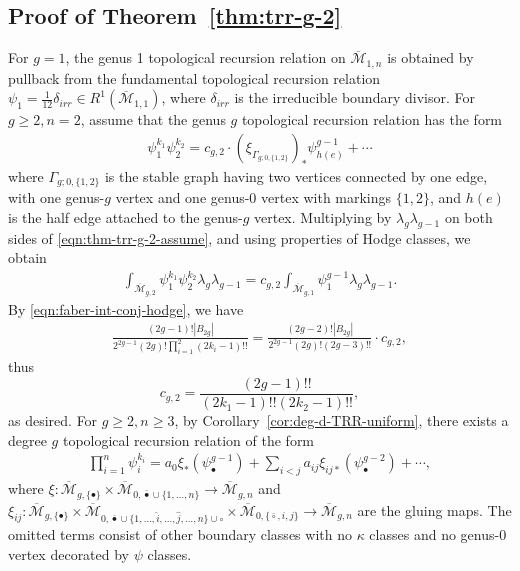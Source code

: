 \documentclass[12pt,reqno]{amsart}
\theoremstyle{plain}
\theoremstyle{definition}
\theoremstyle{remark}
\begin{document}
\subsection{Proof of Theorem~\ref{thm:trr-g-2}}
For $g=1$, the genus 1 topological recursion relation on $\overline{\mathcal{M}}_{1,n}$ is obtained by pullback from the fundamental topological recursion relation $\psi_1=\frac{1}{12}\delta_{irr}\in R^1(\overline{\mathcal{M}}_{1,1})$, where $\delta_{irr}$ is the irreducible boundary divisor.
For $g\geq2, n=2$, assume that the genus $g$ topological recursion relation has the form
\begin{align}\label{eqn:thm-trr-g-2-assume}
\psi_1^{k_1}\psi_2^{k_2}=c_{g,2}\cdot\left(\xi_{\Gamma_{g;0,\{1,2\}}}\right)_*\psi_{h(e)}^{g-1}+\cdots
\end{align}
where $\Gamma_{g;0,\{1,2\}}$ is the stable graph having two vertices connected by one edge, with one genus-$g$ vertex and one genus-0 vertex with markings $\{1,2\}$, and $h(e)$ is the half edge attached to the genus-$g$ vertex.  
Multiplying by $\lambda_{g}\lambda_{g-1}$ on both sides of \eqref{eqn:thm-trr-g-2-assume}, and using properties of Hodge classes, we obtain
\begin{align*}
\int_{\overline{\mathcal{M}}_{g,2}}\psi_1^{k_1}\psi_{2}^{k_2}\lambda_g\lambda_{g-1}=c_{g,2}\int_{\overline{\mathcal{M}}_{g,1}}\psi_1^{g-1}\lambda_g\lambda_{g-1}.   
\end{align*}
By \eqref{eqn:faber-int-conj-hodge}, we have
\begin{align*}
\frac{(2g-1)!
|B_{2g}|}{2^{2g-1}(2g)!\prod_{i=1}^{2}(2k_i-1)!!}=\frac{(2g-2)!
|B_{2g}|}{2^{2g-1}(2g)!(2g-3)!!}  \cdot c_{g,2},  
\end{align*}
thus
\[c_{g,2}=\frac{(2g-1)!!}{(2k_1-1)!!(2k_2-1)!!},\]
as desired.
For $g\geq2, n\geq3$, by Corollary~\ref{cor:deg-d-TRR-uniform}, there exists a degree $g$ topological recursion relation of the form
\begin{align}\label{eqn:deg=g-rational}
\prod_{i=1}^{n}\psi_i^{k_i}=a_0\xi_{*}(\psi_{\bullet}^{g-1})+\sum_{i<j}a_{ij}\xi_{ij*}(\psi^{g-2}_{\bullet})+\cdots, \end{align}
where $\xi:\overline{\mathcal{M}}_{g,\{\bullet\}}\times\overline{\mathcal{M}}_{0,\bar{\bullet}\cup\{1,\dots,n\}}\rightarrow \overline{\mathcal{M}}_{g,n}$  and $\xi_{ij}:\overline{\mathcal{M}}_{g,\{\bullet\}}\times\overline{\mathcal{M}}_{0,\bar{\bullet}\cup\{1,\dots,\hat{i},\dots,\hat{j},\dots,n\}\cup\circ}\times\overline{\mathcal{M}}_{0,\{\bar{\circ},i,j\}}\rightarrow \overline{\mathcal{M}}_{g,n}$ are the gluing maps. The omitted terms consist of other boundary classes with no $\kappa$ classes and no genus-0 vertex decorated by $\psi$ classes.
\end{document}

